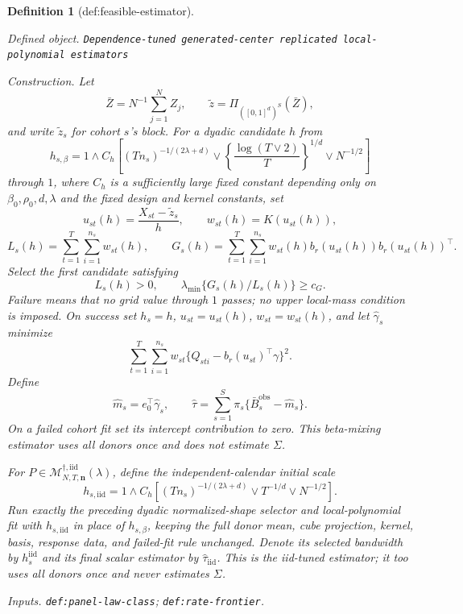 \documentclass{article}
\newtheorem{definition}{Definition}
\begin{document}
\begin{definition}[def:feasible-estimator]\label{def:feasible-estimator}
\par\smallskip\noindent\emph{Defined object.} \texttt{Dependence-\allowbreak{}tuned generated-\allowbreak{}center replicated local-\allowbreak{}polynomial estimators}
\par\smallskip\noindent\emph{Construction.} Let
\[
\bar Z=N^{-1}\sum_{j=1}^{N}Z_j,
\qquad
\widetilde z=\Pi_{([0,1]^d)^S}(\bar Z),
\]
and write \(\widetilde z_s\) for cohort \(s\)'s block.  For a dyadic candidate \(h\) from
\[
h_{s,\beta}
=1\wedge C_h\left[
(Tn_s)^{-1/(2\lambda+d)}
\vee\left\{\frac{\log(T\vee2)}T\right\}^{1/d}
\vee N^{-1/2}
\right]
\]
through \(1\), where \(C_h\) is a sufficiently large fixed constant depending only on \(\beta_0,\rho_0,d,\lambda\) and the fixed design and kernel constants, set
\[
u_{st}(h)=\frac{X_{st}-\widetilde z_s}{h},
\qquad
w_{st}(h)=K(u_{st}(h)),
\]
\[
L_s(h)=\sum_{t=1}^{T}\sum_{i=1}^{n_s}w_{st}(h),
\qquad
G_s(h)=\sum_{t=1}^{T}\sum_{i=1}^{n_s}
w_{st}(h)b_r(u_{st}(h))b_r(u_{st}(h))^\top.
\]
Select the first candidate satisfying
\[
L_s(h)>0,
\qquad
\lambda_{\min}\{G_s(h)/L_s(h)\}\ge c_G.
\]
Failure means that no grid value through \(1\) passes; no upper local-mass condition is imposed.  On success set \(h_s=h\), \(u_{st}=u_{st}(h)\), \(w_{st}=w_{st}(h)\), and let \(\widehat\gamma_s\) minimize
\[
\sum_{t=1}^{T}\sum_{i=1}^{n_s}
w_{st}\{Q_{sti}-b_r(u_{st})^\top\gamma\}^2.
\]
Define
\[
\widehat m_s=e_0^\top\widehat\gamma_s,
\qquad
\widehat\tau=\sum_{s=1}^{S}\pi_s
\{\bar B_s^{\mathrm{obs}}-\widehat m_s\}.
\]
On a failed cohort fit set its intercept contribution to zero.  This beta-mixing estimator uses all donors once and does not estimate \(\Sigma\).

For \(P\in\mathcal M_{N,T,\mathbf n}^{\dagger,\mathrm{iid}}(\lambda)\), define the independent-calendar initial scale
\[
h_{s,\mathrm{iid}}
=1\wedge C_h\left[
(Tn_s)^{-1/(2\lambda+d)}\vee T^{-1/d}\vee N^{-1/2}
\right].
\]
Run exactly the preceding dyadic normalized-shape selector and local-polynomial fit with \(h_{s,\mathrm{iid}}\) in place of \(h_{s,\beta}\), keeping the full donor mean, cube projection, kernel, basis, response data, and failed-fit rule unchanged.  Denote its selected bandwidth by \(h_s^{\mathrm{iid}}\) and its final scalar estimator by \(\widehat\tau_{\mathrm{iid}}\).  This is the iid-tuned estimator; it too uses all donors once and never estimates \(\Sigma\).
\par\smallskip\noindent\emph{Inputs.} \texttt{def:\allowbreak{}panel-\allowbreak{}law-\allowbreak{}class}; \texttt{def:\allowbreak{}rate-\allowbreak{}frontier}.
\end{definition}
\end{document}
